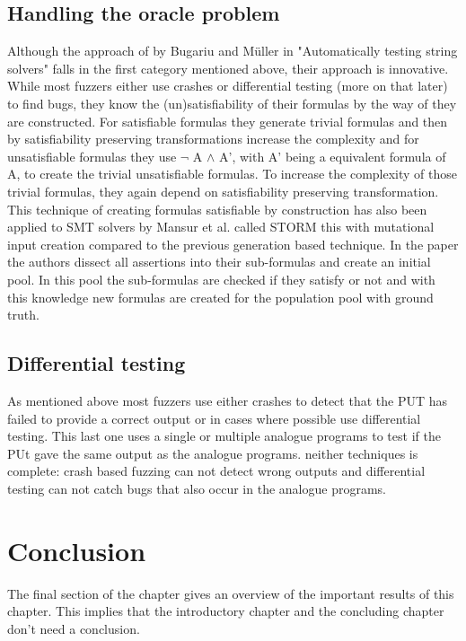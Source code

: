 \subsection{Handling the oracle problem}
\label{cha:2:handelingOracelproblem}
Although the approach of by Bugariu and M\"uller in "Automatically testing string solvers"\cite{9bugariu2020automaticallyTestingStringSolvers} falls in the first category mentioned above, their approach is innovative. While most fuzzers either use crashes or differential testing (more on that later) to find bugs, they know the (un)satisfiability of their formulas by the way of they are constructed. For satisfiable formulas they generate trivial formulas and then by satisfiability preserving transformations increase the complexity and for unsatisfiable formulas they use $\neg$ A $\land$ A', with A' being a equivalent formula of A, to create the trivial unsatisfiable formulas. To increase the complexity of those trivial formulas, they again depend on satisfiability preserving transformation. This technique of creating formulas satisfiable by construction has also been applied to SMT solvers by Mansur et al. called STORM\cite{1mansur2020detecting} this with mutational input creation compared to the previous generation based technique. In the paper the authors dissect all assertions into their sub-formulas and create an initial pool. In this pool the sub-formulas are checked if they satisfy or not and with this knowledge new formulas are created for the population pool with ground truth.

\subsection{Differential testing}
\label{cha:2:Differential}
As mentioned above most fuzzers use either crashes to detect that the PUT has failed to provide a correct output or in cases where possible use differential testing. This last one uses a single or multiple analogue programs to test if the PUt gave the same output as the analogue programs. neither techniques is complete: crash based fuzzing can not detect wrong outputs and differential testing can not catch bugs that also occur in the analogue programs.




\section{Conclusion}
\label{cha:2:conclusion}
The final section of the chapter gives an overview of the important results
of this chapter. This implies that the introductory chapter and the
concluding chapter don't need a conclusion.



